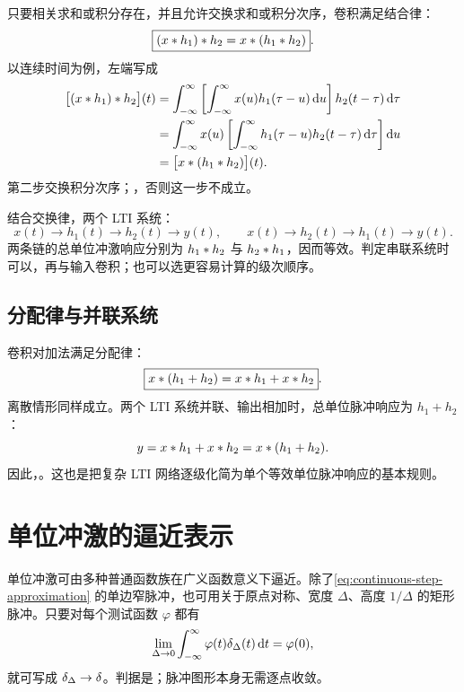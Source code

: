 只要相关求和或积分存在，并且允许交换求和或积分次序，卷积满足结合律：
\begin{equation}
  \boxed{
    (x\mathbin{\ast} h_1)\mathbin{\ast} h_2
    =x\mathbin{\ast}(h_1\mathbin{\ast} h_2)
  }.
  \label{eq:convolution-associativity}
\end{equation}
以连续时间为例，左端写成
\begin{align*}
  \bigl[(x\mathbin{\ast} h_1)\mathbin{\ast} h_2\bigr](t)
  &=\int_{-\infty}^{\infty}
    \left[\int_{-\infty}^{\infty}
      x(u)h_1(\tau-u)\mathop{}\!\mathrm{d} u
    \right]h_2(t-\tau)\mathop{}\!\mathrm{d}\tau\\
  &=\int_{-\infty}^{\infty}x(u)
    \left[\int_{-\infty}^{\infty}
      h_1(\tau-u)h_2(t-\tau)\mathop{}\!\mathrm{d}\tau
    \right]\mathop{}\!\mathrm{d} u\\
  &=\bigl[x\mathbin{\ast}(h_1\mathbin{\ast} h_2)\bigr](t).
\end{align*}
第二步交换积分次序；，否则这一步不成立。

结合交换律，两个 LTI 系统：
\[
  x(t)\longrightarrow\boxed{h_1(t)}
  \longrightarrow\boxed{h_2(t)}\longrightarrow y(t),
  \qquad
  x(t)\longrightarrow\boxed{h_2(t)}
  \longrightarrow\boxed{h_1(t)}\longrightarrow y(t).
\]
两条链的总单位冲激响应分别为 $h_1\mathbin{\ast} h_2$ 与 $h_2\mathbin{\ast} h_1$，因而等效。判定串联系统时可以，再与输入卷积；也可以选更容易计算的级次顺序。

\subsection{分配律与并联系统}

卷积对加法满足分配律：
\begin{equation}
  \boxed{
    x\mathbin{\ast}(h_1+h_2)
    =x\mathbin{\ast} h_1+x\mathbin{\ast} h_2
  }.
  \label{eq:convolution-distributivity}
\end{equation}
离散情形同样成立。两个 LTI 系统并联、输出相加时，总单位脉冲响应为 $h_1+h_2$：
\[
  y=x\mathbin{\ast} h_1+x\mathbin{\ast} h_2=x\mathbin{\ast}(h_1+h_2).
\]
因此，。这也是把复杂 LTI 网络逐级化简为单个等效单位脉冲响应的基本规则。

\section{单位冲激的逼近表示}
\label{sec:impulse-approximations}

单位冲激可由多种普通函数族在广义函数意义下逼近。除了\cref{eq:continuous-step-approximation} 的单边窄脉冲，也可用关于原点对称、宽度 $\Delta$、高度 $1/\Delta$ 的矩形脉冲。只要对每个测试函数 $\varphi$ 都有
\[
  \lim_{\Delta\to0}
  \int_{-\infty}^{\infty}\varphi(t)\delta_\Delta(t)\mathop{}\!\mathrm{d} t
  =\varphi(0),
\]
就可写成 $\delta_\Delta\to\delta$。判据是；脉冲图形本身无需逐点收敛。

